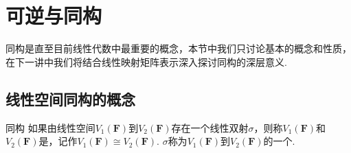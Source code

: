 \section{可逆与同构}

同构是直至目前线性代数中最重要的概念，本节中我们只讨论基本的概念和性质，在下一讲中我们将结合线性映射矩阵表示深入探讨同构的深层意义.

\subsection{线性空间同构的概念}

\begin{definition}{同构}{} 
    如果由线性空间$V_1(\mathbf{F})$到$V_2(\mathbf{F})$存在一个线性双射$\sigma$，则称$V_1(\mathbf{F})$和$V_2(\mathbf{F})$是，记作$V_1(\mathbf{F}) \cong V_2(\mathbf{F})$. $\sigma$称为$V_1(\mathbf{F})$到$V_2(\mathbf{F})$的一个.
\end{definition}

